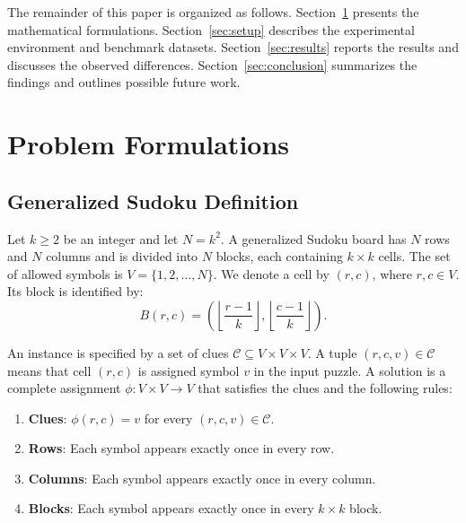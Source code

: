 \documentclass[a4paper,fleqn]{cas-sc}
\begin{document}
The remainder of this paper is organized as follows. Section~\ref{sec:formulations} presents the mathematical formulations. Section~\ref{sec:setup} describes the experimental environment and benchmark datasets. Section~\ref{sec:results} reports the results and discusses the observed differences. Section~\ref{sec:conclusion} summarizes the findings and outlines possible future work.

\section{Problem Formulations}
\label{sec:formulations}

\subsection{Generalized Sudoku Definition}
Let $k \ge 2$ be an integer and let $N = k^2$. A generalized Sudoku board has $N$ rows and $N$ columns and is divided into $N$ blocks, each containing $k \times k$ cells. The set of allowed symbols is $V = \{1,2,\ldots,N\}$. We denote a cell by $(r,c)$, where $r,c \in V$. Its block is identified by:
\begin{equation}
    B(r, c) = \left( \left\lfloor \frac{r-1}{k} \right\rfloor, \left\lfloor \frac{c-1}{k} \right\rfloor \right).
\end{equation}

An instance is specified by a set of clues
$\mathcal{C} \subseteq V \times V \times V$.
A tuple $(r,c,v) \in \mathcal{C}$ means that cell $(r,c)$ is assigned symbol $v$ in the input puzzle. A solution is a complete assignment
$\phi: V \times V \to V$ that satisfies the clues and the following rules:

\begin{enumerate}
    \item \textbf{Clues}: $\phi(r,c)=v$ for every $(r,c,v) \in \mathcal{C}$.
    \item \textbf{Rows}: Each symbol appears exactly once in every row.
    \item \textbf{Columns}: Each symbol appears exactly once in every column.
    \item \textbf{Blocks}: Each symbol appears exactly once in every $k \times k$ block.
\end{enumerate}
\end{document}
